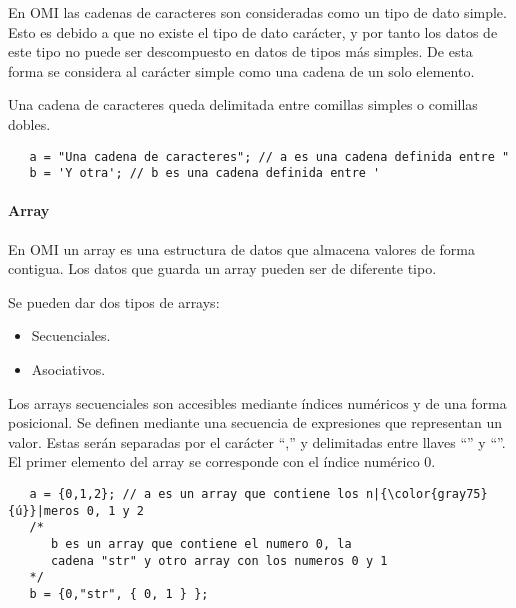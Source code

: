En OMI las cadenas de caracteres son consideradas como un tipo de dato simple. Esto es debido a que no existe el tipo de dato carácter, y por tanto los datos de este tipo no puede ser 
descompuesto en datos de tipos más simples. De esta forma se considera al carácter simple como una cadena de un solo elemento.

Una cadena de caracteres queda delimitada entre comillas simples o comillas dobles. \\

\begin{lstlisting}
   a = "Una cadena de caracteres"; // a es una cadena definida entre "
   b = 'Y otra'; // b es una cadena definida entre '
\end{lstlisting}


\paragraph{Array}\label{sec:type_array}

En OMI un array es una estructura de datos que almacena valores de forma contigua. Los datos que guarda un array pueden ser de diferente tipo. 

Se pueden dar dos tipos de arrays:

\begin{itemize}
\item Secuenciales.
\item Asociativos.
\end{itemize}

Los arrays secuenciales son accesibles mediante índices numéricos y de una forma posicional. Se definen mediante una secuencia de expresiones que representan 
un valor. Estas serán separadas por el carácter ``,'' y delimitadas entre llaves ``{'' y ``}''. El primer elemento del array se corresponde con el índice numérico $0$. \\

 \begin{lstlisting}
   a = {0,1,2}; // a es un array que contiene los n|{\color{gray75}{ú}}|meros 0, 1 y 2
   /* 
      b es un array que contiene el numero 0, la
      cadena "str" y otro array con los numeros 0 y 1
   */
   b = {0,"str", { 0, 1 } }; 
\end{lstlisting}

